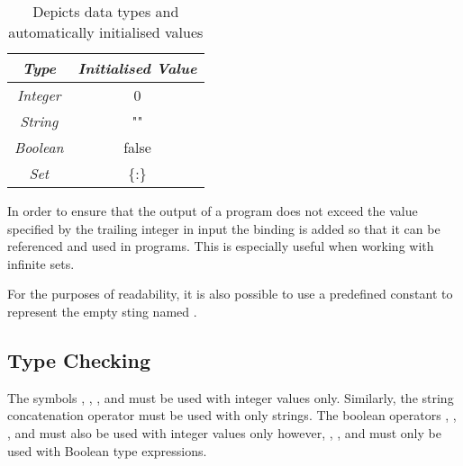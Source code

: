 \documentclass{article}
\begin{document}
\begin{table}[h!]
    \centering
    \begin{tabular}{|c|c|}
        \hline
        \emph{Type}     & \emph{Initialised Value}\\\hline
        \emph{Integer}  & 0\\                       \hline
        \emph{String}   & ""\\                      \hline
        \emph{Boolean}  & false\\                   \hline
        \emph{Set}      & \{:\}\\                   \hline
    \end{tabular}
    \caption{Depicts data types and automatically initialised values}
    \label{table:1}
\end{table}

In order to ensure that the output of a program does not exceed the value 
specified by the trailing integer in input the binding \OC is added so that it 
can be referenced and used in programs. This is especially useful when working 
with infinite sets.


For the purposes of readability, it is also possible to use a predefined 
constant to represent the empty sting named \ES.

\subsection{Type Checking}
The symbols \PLUS, \MINUS, \DIVIDE, and \TIMES must be used with integer values 
only. Similarly, the string concatenation operator \CON must be used with only 
strings. The boolean operators \GT, \GTE, \LT, and \LTE must also be used with 
integer values only however, \OR, \AND, and \NOT must only be used with Boolean 
type expressions.
\end{document}

